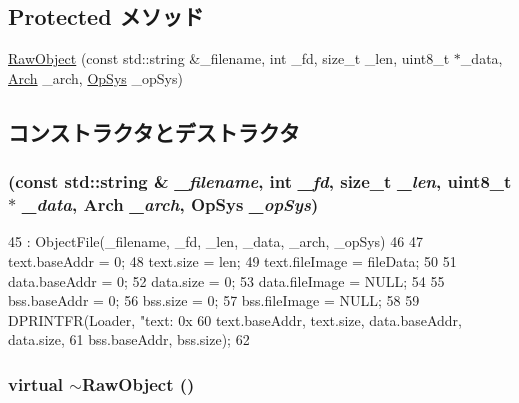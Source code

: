 \subsection*{Protected メソッド}
\begin{DoxyCompactItemize}
\item 
\hyperlink{classRawObject_ace4afaf2b34a47da495a3e075b57133d}{RawObject} (const std::string \&\_\-filename, int \_\-fd, size\_\-t \_\-len, uint8\_\-t $\ast$\_\-data, \hyperlink{classObjectFile_a0ac03ab06a859320a9072002bdf3aa0f}{Arch} \_\-arch, \hyperlink{classObjectFile_aafc438343baf22e5884dde40c41331e8}{OpSys} \_\-opSys)
\end{DoxyCompactItemize}


\subsection{コンストラクタとデストラクタ}
\hypertarget{classRawObject_ace4afaf2b34a47da495a3e075b57133d}{
\subsubsection[{RawObject}]{ (const std::string \& {\em \_\-filename}, \/  int {\em \_\-fd}, \/  size\_\-t {\em \_\-len}, \/  uint8\_\-t $\ast$ {\em \_\-data}, \/  {\bf Arch} {\em \_\-arch}, \/  {\bf OpSys} {\em \_\-opSys})}}
\label{classRawObject_ace4afaf2b34a47da495a3e075b57133d}



\begin{DoxyCode}
45     : ObjectFile(_filename, _fd, _len, _data, _arch, _opSys)
46 {
47     text.baseAddr = 0;
48     text.size = len;
49     text.fileImage = fileData;
50 
51     data.baseAddr = 0;
52     data.size = 0;
53     data.fileImage = NULL;
54 
55     bss.baseAddr = 0;
56     bss.size = 0;
57     bss.fileImage = NULL;
58 
59     DPRINTFR(Loader, "text: 0x%
60              text.baseAddr, text.size, data.baseAddr, data.size,
61              bss.baseAddr, bss.size);
62 }
\end{DoxyCode}
\hypertarget{classRawObject_a466628ccdca732c9c94d786536b3f785}{
\subsubsection[{$\sim$RawObject}]{\setlength{\rightskip}{0pt plus 5cm}virtual $\sim${\bf RawObject} ()}}
\label{classRawObject_a466628ccdca732c9c94d786536b3f785}



